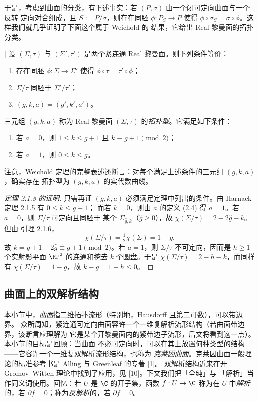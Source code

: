 于是，考虑到曲面的分类，有下述事实：若 $(P,\sigma)$ 由一个闭可定向曲面与一个反转
定向对合组成，且 $S:=P/\sigma$，则存在同胚 $\phi:P_S\to P$ 使得
$\phi\circ\sigma_S=\sigma\circ\phi$。这样我们就几乎证明了下面这个属于 Weichold 的
结果，它给出 Real 黎曼面的拓扑分类。

\begin{theorem}[Weichold, [20]]\label{thm:2.1.8}
设 $(\Sigma,\tau)$ 与 $(\Sigma',\tau')$ 是两个紧连通 Real 黎曼面。则下列条件等价：
\begin{enumerate}[label=(\alph*), leftmargin=2.2em, itemsep=0.15em]
\item 存在同胚 $\phi:\Sigma\to\Sigma'$ 使得 $\phi\circ\tau=\tau'\circ\phi$；
\item $\Sigma/\tau$ 同胚于 $\Sigma'/\tau'$；
\item $(g,k,a)=(g',k',a')$。
\end{enumerate}
\end{theorem}

三元组 $(g,k,a)$ 称为 Real 黎曼面 $(\Sigma,\tau)$ 的\emph{拓扑型}。它满足如下条件：
\begin{enumerate}[label=(\roman*), leftmargin=2.2em, itemsep=0.15em]
\item 若 $a=0$，则 $1\le k\le g+1$ 且 $k\equiv g+1 \pmod 2$；
\item 若 $a=1$，则 $0\le k\le g$。
\end{enumerate}
注意，Weichold 定理的完整表述还断言：对每个满足上述条件的三元组 $(g,k,a)$，确实存在
拓扑型为 $(g,k,a)$ 的实代数曲线。

\begin{proof}[定理 2.1.8 的证明]
只需再证 $(g,k,a)$ 必须满足定理中列出的条件。由 Harnack 定理 2.1.5 有 $0\le k\le g+1$；
而若 $k=0$，则由 $a$ 的定义 (2.4) 得 $a=1$。若 $a=0$，则 $\Sigma/\tau$ 可定向且同胚于
某个 $\Sigma_{\hat g,k}$（$\hat g\ge0$），故 $\chi(\Sigma/\tau)=2-2\hat g-k$。但由
引理 2.1.6，
\[
\chi(\Sigma/\tau)=\tfrac12\chi(\Sigma)=1-g,
\]
故 $k=g+1-2\hat g\equiv g+1\pmod2$。若 $a=1$，则 $\Sigma/\tau$ 不可定向，因而是
$h\ge1$ 个实射影平面 $\RP^2$ 的连通和挖去 $k$ 个圆盘。于是
$\chi(\Sigma/\tau)=2-h-k$，而同样有 $\chi(\Sigma/\tau)=1-g$，故 $k-g=1-h\le0$。
\end{proof}

\subsection{曲面上的双解析结构}
\label{sec:02.1.3}

本小节中，\emph{曲面}指二维拓扑流形（特别地，Hausdorff 且第二可数），可以带边界。
众所周知，紧连通可定向曲面容许一个一维复解析流形结构（若曲面带边界，该断言应理解为
它是某个开黎曼面内的紧带边子流形，后文将看到这一点）。本小节的目标是回顾：当曲面
不必可定向时，可以在其上放置何种类型的结构——它容许一个一维复双解析流形结构，也称为
\emph{克莱因曲面}。克莱因曲面一般理论的标准参考书是 Alling 与 Greenleaf 的专著 [1]。
双解析结构近来在开 Gromov--Witten 理论中找到了应用，见 [10]。下文我们把「全纯」与
「解析」当作同义词使用。回忆：若 $U$ 是 $\C$ 的开子集，函数 $f:U\to\C$ 称为在 $U$
中\emph{解析}的，若 $\bar\partial f=0$；称为\emph{反解析}的，若 $\partial f=0$。


